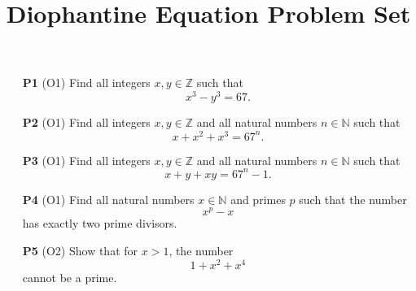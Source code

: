 \documentclass[12pt]{article}
\begin{document}
	
	\title{Diophantine Equation Problem Set}

	\maketitle
	
	\begin{enumerate}
		\item[\textbf{P1} (O1)] Find all integers \(x,y \in \mathbb{Z}\) such that
		\[
		x^{3} - y^{3} = 67.
		\]
		
		\item[\textbf{P2} (O1)] Find all integers \(x,y \in \mathbb{Z}\) and all natural numbers \(n \in \mathbb{N}\) such that
		\[
		x + x^{2} + x^{3} = 67^{n}.
		\]
		
		\item[\textbf{P3} (O1)] Find all integers \(x,y \in \mathbb{Z}\) and all natural numbers \(n \in \mathbb{N}\) such that
		\[
		x + y + xy = 67^{n} - 1.
		\]
		
		\item[\textbf{P4} (O1)] Find all natural numbers \(x \in \mathbb{N}\) and primes \(p\) such that the number
		\[
		x^{p} - x
		\]
		has exactly two prime divisors.
		
		\item[\textbf{P5} (O2)] Show that for \(x > 1\), the number
		\[
		1 + x^{2} + x^{4}
		\]
		cannot be a prime.
	\end{enumerate}
	
\end{document}
